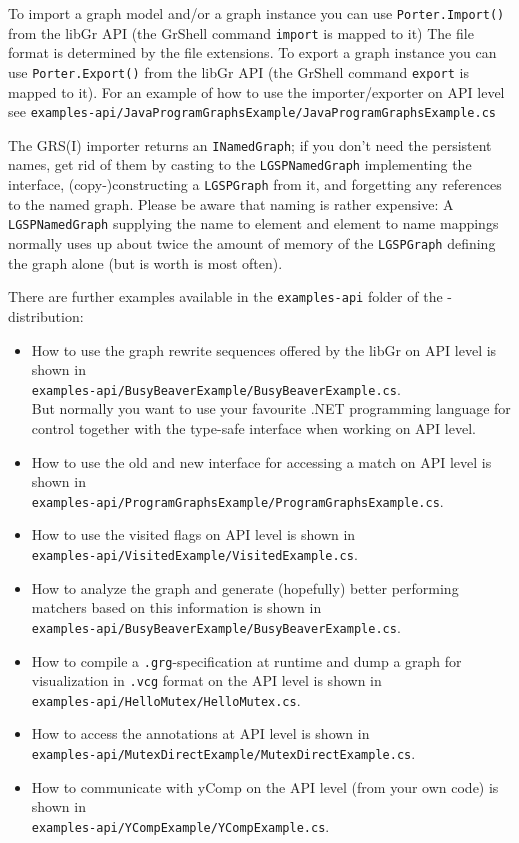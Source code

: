 To import a graph model and/or a graph instance you can use \texttt{Porter.Import()} from the libGr API (the GrShell command \texttt{import} is mapped to it)
The file format is determined by the file extensions.
To export a graph instance you can use \texttt{Porter.Export()} from the libGr API (the GrShell command \texttt{export} is mapped to it).
For an example of how to use the importer/exporter on API level see \texttt{examples-api/JavaProgramGraphsExample/JavaProgramGraphs\-Example.cs}

The GRS(I) importer returns an \texttt{INamedGraph};
if you don't need the persistent names, get rid of them by casting to the \texttt{LGSPNamedGraph} implementing the interface, (copy-)constructing a \texttt{LGSPGraph} from it, and forgetting any references to the named graph.
Please be aware that naming is rather expensive:
A \texttt{LGSPNamedGraph} supplying the name to element and element to name mappings normally uses up about twice the amount of memory of the \texttt{LGSPGraph} defining the graph alone (but is worth is most often).

There are further examples available in the \texttt{examples-api} folder of the \GrG-distribution:
\begin{itemize} 
\item How to use the graph rewrite sequences offered by the libGr on API level is shown in\\
\texttt{examples-api/BusyBeaverExample/BusyBeaverExample.cs}.\\
But normally you want to use your favourite .NET programming language for control together with the type-safe interface when working on API level.
\item How to use the old and new interface for accessing a match on API level is shown in\\
\texttt{examples-api/ProgramGraphsExample/ProgramGraphsExample.cs}.
\item How to use the visited\label{apiallocvisitflag} flags on API level is shown in\\
\texttt{examples-api/VisitedExample/VisitedExample.cs}.
\item How to analyze the graph and generate (hopefully) better performing matchers based on this information is shown in\\
\texttt{examples-api/BusyBeaverExample/BusyBeaverExample.cs}.
\item How to compile a \texttt{.grg}-specification at runtime and dump a graph for visualization in \texttt{.vcg} format on the API level is shown in\\
\texttt{examples-api/HelloMutex/HelloMutex.cs}.
\item How to access the annotations at API level is shown in\\
\texttt{examples-api/MutexDirectExample/MutexDirectExample.cs}.
\item How to communicate with yComp on the API level (from your own code) is shown in\\
\texttt{examples-api/YCompExample/YCompExample.cs}.
\end{itemize}

